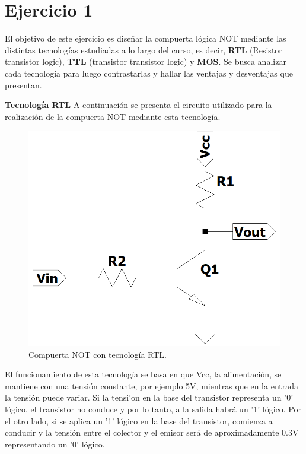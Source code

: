 \section{Ejercicio 1}
\noindent
El objetivo de este ejercicio es dise\~nar la compuerta l\'ogica NOT mediante las distintas tecnolog\'ias estudiadas a lo largo del curso, es decir, \textbf{RTL} (Resistor transistor logic), \textbf{TTL} (transistor transistor logic) y \textbf{MOS}. Se busca analizar cada tecnolog\'ia para luego contrastarlas y hallar las ventajas y desventajas que presentan. 
\vspace{10mm}


{\large\textbf{Tecnolog\'ia RTL}}\newline
\noindent
A continuaci\'on se presenta el circuito utilizado para la realizaci\'on de la compuerta NOT mediante esta tecnolog\'ia.

\begin{figure}[h!]
\center
    \includegraphics[scale = 0.45]{figs/ej1/not_rtl.png}
    \caption{Compuerta NOT con tecnolog\'ia RTL.}
\label{fig:ej1_rtl}
\end{figure}
\noindent\newline
El funcionamiento de esta tecnolog\'ia se basa en que Vcc, la alimentaci\'on, se mantiene con una tensi\'on constante, por ejemplo 5V, mientras que en la entrada la tensi\'on puede variar. Si la tensi'on en la base del transistor representa un '0' l\'ogico, el transistor no conduce y por lo tanto, a la salida habr\'a un '1' l\'ogico. Por el otro lado, si se aplica un '1' l\'ogico en la base del transistor, comienza a conducir y la tensi\'on entre el colector y el emisor ser\'a de aproximadamente 0.3V representando un '0' l\'ogico.

